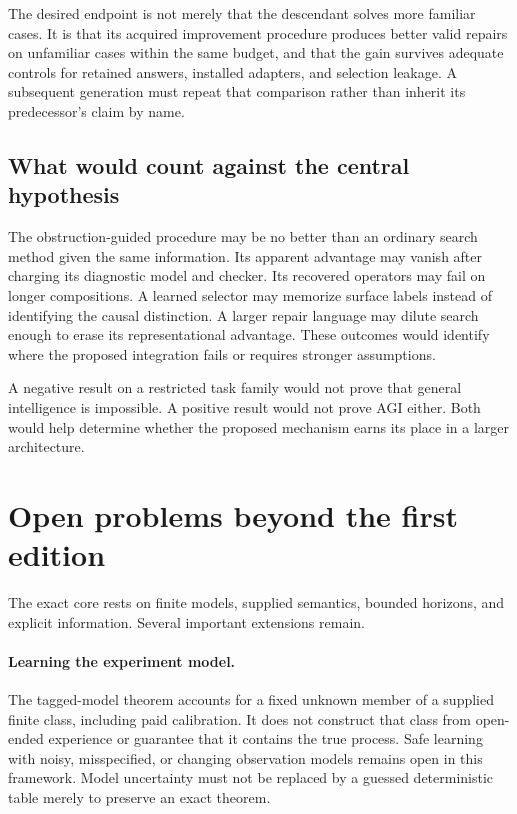 The desired endpoint is not merely that the descendant solves more familiar cases. It is that its acquired improvement procedure produces better valid repairs on unfamiliar cases within the same budget, and that the gain survives adequate controls for retained answers, installed adapters, and selection leakage. A subsequent generation must repeat that comparison rather than inherit its predecessor's claim by name.

\subsection{What would count against the central hypothesis}
The obstruction-guided procedure may be no better than an ordinary search method given the same information. Its apparent advantage may vanish after charging its diagnostic model and checker. Its recovered operators may fail on longer compositions. A learned selector may memorize surface labels instead of identifying the causal distinction. A larger repair language may dilute search enough to erase its representational advantage. These outcomes would identify where the proposed integration fails or requires stronger assumptions.

A negative result on a restricted task family would not prove that general intelligence is impossible. A positive result would not prove AGI either. Both would help determine whether the proposed mechanism earns its place in a larger architecture.

\section{Open problems beyond the first edition}\label{SII:sec:limits}
The exact core rests on finite models, supplied semantics, bounded horizons, and explicit information. Several important extensions remain.

\paragraph{Learning the experiment model.}
The tagged-model theorem accounts for a fixed unknown member of a supplied finite class, including paid calibration. It does not construct that class from open-ended experience or guarantee that it contains the true process. Safe learning with noisy, misspecified, or changing observation models remains open in this framework. Model uncertainty must not be replaced by a guessed deterministic table merely to preserve an exact theorem.

